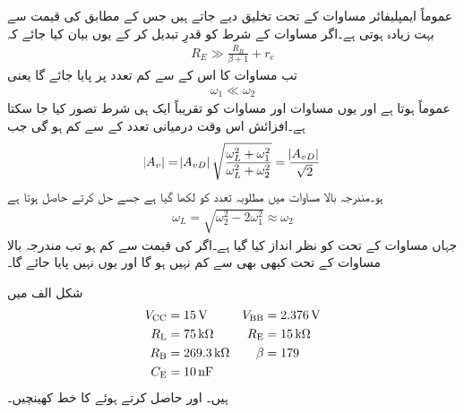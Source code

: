 عموماً ایمپلیفائر مساوات  کے تحت تخلیق دیے جاتے ہیں جس کے مطابق  کی قیمت  سے بہت زیادہ ہوتی ہے۔اگر مساوات  کے شرط کو قدرِ تبدیل کر کے یوں بیان کیا جائے کہ
\begin{align} \label{مساوات_تعددی_ردعمل_مخارج_قابو_مزاحمت_کی_شرح}
R_E \gg \frac{R_B}{\beta+1}+r_e
\end{align}
تب مساوات  کا  اس کے  سے کم تعدد پر پایا جائے گا یعنی
\begin{align} \label{مساوات_تعددی_ردعمل_بلند_تعدد_پست_سے_نہایت_زیادہ}
\omega_1 \ll \omega_2
\end{align}
عموماً  ہوتا ہے اور یوں مساوات   اور مساوات  کو تقریباً ایک ہی شرط تصور کیا جا سکتا ہے۔افزائش   اس وقت درمیانی تعدد کے  سے   کم ہو گی جب
\begin{align}
\abs{A_v}=\abs{A_{vD}} \sqrt{\frac{\omega_L^2 + \omega_1^2}{\omega_L^2 +\omega_2^2}}=\frac{\abs{A_{vD}}}{\sqrt{2}}
\end{align}
ہو۔مندرجہ بالا مساوات میں مطلوبہ تعدد کو  لکھا گیا ہے جسے حل کرتے حاصل ہوتا ہے
\begin{align} \label{مساوات_تعددی_ردعمل_پست_انقطاعی_تعدد_سادہ_مساوات}
\omega_L=\sqrt{\omega_2^2 -2 \omega_1^2} \approx \omega_2
\end{align}
جہاں مساوات  کے تحت  کو نظر انداز کیا گیا ہے۔اگر  کی قیمت  سے کم ہو تب مندرجہ بالا مساوات کے تحت  کبھی بھی   سے   کم نہیں ہو گا اور یوں  نہیں پایا جائے گا۔

شکل  الف میں
\begin{align*}
V_{\textup{CC}} &=\SI{15}{\volt} & V_{\textup{BB}} &=\SI{2.376}{\volt} \\
R_{\textup{L}} &=\SI{75}{\kilo \ohm} &  R_{\textup{E}} &=\SI{15}{\kilo \ohm}\\
R_{\textup{B}} &=\SI{269.3}{\kilo \ohm} & \beta &=\num{179}\\
C_{\textup{E}}&=\SI{10}{\nano \farad}
\end{align*}
ہیں۔  اور  حاصل کرتے ہوئے  کا خط کھینچیں۔

